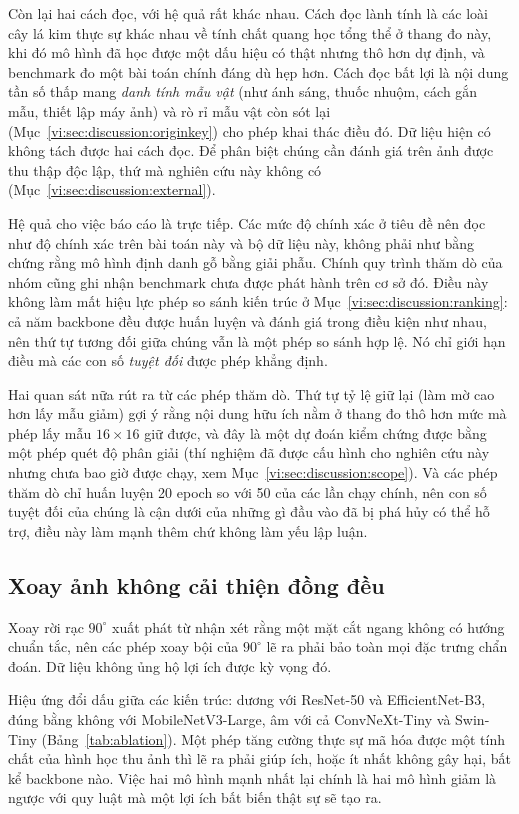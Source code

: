 Còn lại hai cách đọc, với hệ quả rất khác nhau. Cách đọc lành tính là các loài
cây lá kim thực sự khác nhau về tính chất quang học tổng thể ở thang đo này,
khi đó mô hình đã học được một dấu hiệu có thật nhưng thô hơn dự định, và
benchmark đo một bài toán chính đáng dù hẹp hơn. Cách đọc bất lợi là nội dung
tần số thấp mang \emph{danh tính mẫu vật} (như ánh sáng, thuốc nhuộm, cách gắn
mẫu, thiết lập máy ảnh) và rò rỉ mẫu vật còn sót lại
(Mục~\ref{vi:sec:discussion:originkey}) cho phép khai thác điều đó. Dữ liệu
hiện có không tách được hai cách đọc. Để phân biệt chúng cần đánh giá trên ảnh
được thu thập độc lập, thứ mà nghiên cứu này không có
(Mục~\ref{vi:sec:discussion:external}).

Hệ quả cho việc báo cáo là trực tiếp. Các mức độ chính xác ở tiêu đề nên đọc
như độ chính xác trên bài toán này và bộ dữ liệu này, không phải như bằng chứng
rằng mô hình định danh gỗ bằng giải phẫu. Chính quy trình thăm dò của nhóm
cũng ghi nhận benchmark chưa được phát hành trên cơ sở đó. Điều này không làm
mất hiệu lực phép so sánh kiến trúc ở
Mục~\ref{vi:sec:discussion:ranking}: cả năm backbone đều được huấn luyện và
đánh giá trong điều kiện như nhau, nên thứ tự tương đối giữa chúng vẫn là một
phép so sánh hợp lệ. Nó chỉ giới hạn điều mà các con số \emph{tuyệt đối} được
phép khẳng định.

Hai quan sát nữa rút ra từ các phép thăm dò. Thứ tự tỷ lệ giữ lại (làm mờ cao
hơn lấy mẫu giảm) gợi ý rằng nội dung hữu ích nằm ở thang đo thô hơn mức mà
phép lấy mẫu $16\times16$ giữ được, và đây là một dự đoán kiểm chứng được bằng
một phép quét độ phân giải (thí nghiệm đã được cấu hình cho nghiên cứu này
nhưng chưa bao giờ được chạy, xem
Mục~\ref{vi:sec:discussion:scope}). Và các phép thăm dò chỉ huấn luyện 20
epoch so với 50 của các lần chạy chính, nên con số tuyệt đối của chúng là cận
dưới của những gì đầu vào đã bị phá hủy có thể hỗ trợ, điều này làm mạnh
thêm chứ không làm yếu lập luận.

\subsection{Xoay ảnh không cải thiện đồng đều}
\label{vi:sec:discussion:rotation}

Xoay rời rạc $90^\circ$ xuất phát từ nhận xét rằng một mặt cắt ngang không có
hướng chuẩn tắc, nên các phép xoay bội của $90^\circ$ lẽ ra phải bảo toàn mọi
đặc trưng chẩn đoán. Dữ liệu không ủng hộ lợi ích được kỳ vọng đó.

Hiệu ứng đổi dấu giữa các kiến trúc: dương với ResNet-50 và EfficientNet-B3,
đúng bằng không với MobileNetV3-Large, âm với cả ConvNeXt-Tiny và Swin-Tiny
(Bảng~\ref{tab:ablation}). Một phép tăng cường thực sự mã hóa được một tính
chất của hình học thu ảnh thì lẽ ra phải giúp ích, hoặc ít nhất không gây hại,
bất kể backbone nào. Việc hai mô hình mạnh nhất lại chính là hai mô hình giảm
là ngược với quy luật mà một lợi ích bất biến thật sự sẽ tạo ra.

